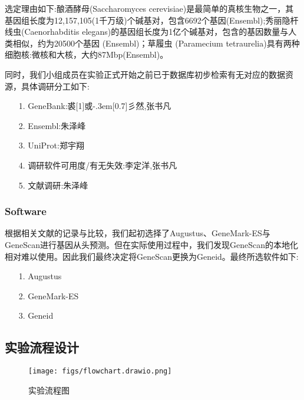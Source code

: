 \documentclass[12pt]{ctexart}
\newcommand{\yu}{\hbox{\scalebox{1}[1]{或}\kern-.3em\scalebox{0.3}[0.7]{彡}}}
\begin{document}
选定理由如下:酿酒酵母(Saccharomyces cerevisiae)是最简单的真核生物之一，其基因组长度为12,157,105(1千万级)个碱基对，包含6692个基因(Ensembl);秀丽隐杆线虫(Caenorhabditis elegans)的基因组长度为1亿个碱基对，包含的基因数量与人类相似，约为20500个基因 (Ensembl)；草履虫 (Paramecium tetraurelia)具有两种细胞核:微核和大核，大约87Mbp(Ensembl)。

同时，我们小组成员在实验正式开始之前已于数据库初步检索有无对应的数据资源，具体调研分工如下:

\begin{itemize}
    \item [1.] GeneBank:裘\yu 然,张书凡
    \item [2.] Ensembl:朱泽峰
    \item [3.] UniProt:郑宇翔
    \item [4.] 调研软件可用度/有无失效:李定洋,张书凡
    \item [5.] 文献调研\citep{10.1016/j.csbj.2016.07.002}:朱泽峰
\end{itemize}

\subsubsection{Software}

根据相关文献\citep{10.1093/nar/gki937}的记录与比较，我们起初选择了Augustus、GeneMark-ES与GeneScan进行基因从头预测。但在实际使用过程中，我们发现GeneScan的本地化相对难以使用。因此我们最终决定将GeneScan更换为Geneid。最终所选软件如下:

\begin{itemize}
    \item [1.] Augustus
    \item [2.] GeneMark-ES
    \item [3.] Geneid
\end{itemize}

\subsection{实验流程设计}

\begin{figure}[h!]
\centering
\texttt{[image: figs/flowchart.drawio.png]}
\caption{实验流程图}
\label{fig:任务流程图}
\end{figure}
\end{document}
